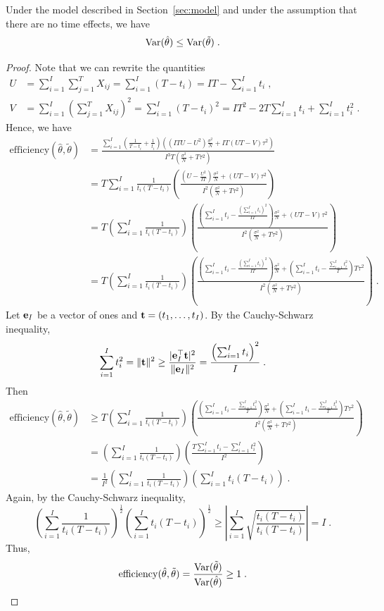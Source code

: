 \documentclass[10pt]{article}
\begin{document}
\begin{proposition} \label{prop:efficiency}
Under the model described in Section~\ref{sec:model} and under the assumption that there are no time effects, we have
\[
\mathrm{Var}(\hat{\theta}) \leq \mathrm{Var}(\tilde{\theta}) \;.
\]
\end{proposition}
\begin{proof}
Note that we can rewrite the quantities
\begin{align*}
U &= \sum_{i=1}^I\sum_{j=1}^TX_{ij} = \sum_{i=1}^I(T-t_i) = IT - \sum_{i=1}^It_i \;, \\
V &= \sum_{i=1}^I\left(\sum_{j=1}^TX_{ij}\right)^2 = \sum_{i=1}^I(T-t_i)^2 = IT^2 - 2T\sum_{i=1}^It_i + \sum_{i=1}^It_i^2 \;.
\end{align*}
Hence, we have
\begin{align*}
\mathrm{efficiency}(\hat{\theta},\tilde{\theta}) &= \frac{\sum_{i=1}^I\left(\frac{1}{T-t_i} + \frac{1}{t_i}\right)\left((ITU-U^2)\frac{\sigma^2}{N}+IT(UT-V)\tau^2\right)}{I^3T\left(\frac{\sigma^2}{N}+T\tau^2\right)} \\
&= T\sum_{i=1}^I\frac{1}{t_i(T-t_i)}\left(\frac{(U-\frac{U^2}{IT})\frac{\sigma^2}{N}+(UT-V)\tau^2}{I^2\left(\frac{\sigma^2}{N}+T\tau^2\right)}\right) \\
&= T\left(\sum_{i=1}^I\frac{1}{t_i(T-t_i)}\right)\left(\frac{\left(\sum_{i=1}^It_i-\frac{\left(\sum_{i=1}^It_i\right)^2}{IT}\right)\frac{\sigma^2}{N}+(UT-V)\tau^2}{I^2\left(\frac{\sigma^2}{N}+T\tau^2\right)}\right) \\
&= T\left(\sum_{i=1}^I\frac{1}{t_i(T-t_i)}\right)\left(\frac{\left(\sum_{i=1}^It_i-\frac{\left(\sum_{i=1}^It_i\right)^2}{IT}\right)\frac{\sigma^2}{N}+\left(\sum_{i=1}^It_i-\frac{\sum_{i=1}^It_i^2}{T}\right)T\tau^2}{I^2\left(\frac{\sigma^2}{N}+T\tau^2\right)}\right) \;.
\end{align*}
Let $\mathbf{e}_I$ be a vector of ones and $\mathbf{t}=(t_1,\ldots,t_I)$. By the Cauchy-Schwarz inequality,
\[
\sum_{i=1}^It_i^2 = \|\mathbf{t}\|^2 \geq \frac{|\mathbf{e}_I^\top\mathbf{t}|^2}{\|\mathbf{e}_I\|^2} = \frac{\left(\sum_{i=1}^It_i\right)^2}{I} \;.
\]
Then
\begin{align*}
\mathrm{efficiency}(\hat{\theta},\tilde{\theta}) &\geq T\left(\sum_{i=1}^I\frac{1}{t_i(T-t_i)}\right)\left(\frac{\left(\sum_{i=1}^It_i-\frac{\sum_{i=1}^It_i^2}{T}\right)\frac{\sigma^2}{N}+\left(\sum_{i=1}^It_i-\frac{\sum_{i=1}^It_i^2}{T}\right)T\tau^2}{I^2\left(\frac{\sigma^2}{N}+T\tau^2\right)}\right) \\
&= \left(\sum_{i=1}^I\frac{1}{t_i(T-t_i)}\right)\left(\frac{T\sum_{i=1}^It_i-\sum_{i=1}^It_i^2}{I^2}\right) \\
&= \frac{1}{I^2}\left(\sum_{i=1}^I\frac{1}{t_i(T-t_i)}\right)\left(\sum_{i=1}^It_i(T-t_i)\right) \;.
\end{align*}
Again, by the Cauchy-Schwarz inequality,
\[
\left(\sum_{i=1}^I\frac{1}{t_i(T-t_i)}\right)^{\frac{1}{2}}\left(\sum_{i=1}^It_i(T-t_i)\right)^\frac{1}{2} \geq \left|\sum_{i=1}^I\sqrt{\frac{t_i(T-t_i)}{t_i(T-t_i)}}\right| = I \;.
\]
Thus,
\[
\mathrm{efficiency}(\hat{\theta},\tilde{\theta}) = \frac{\mathrm{Var}(\tilde{\theta})}{\mathrm{Var}(\hat{\theta})} \geq 1 \;.
\]
\end{proof}
\end{document}
